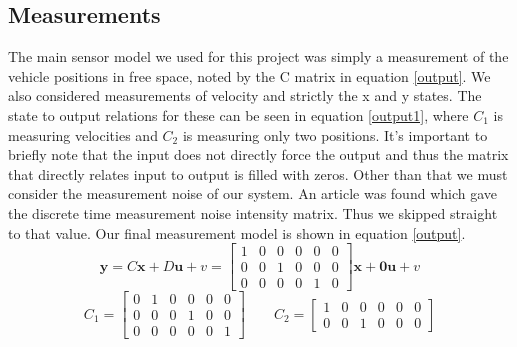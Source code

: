 \documentclass[12pt]{extarticle}
\begin{document}
\subsection{Measurements}{
    The main sensor model we used for this project was simply a measurement of the vehicle positions in free space, noted by the C matrix in equation \ref{output}. We also considered measurements of velocity and strictly the x and y states. The state to output relations for these can be seen in equation \ref{output1}, where $C_1$ is measuring velocities and $C_2$ is measuring only two positions. It's important to briefly note that the input does not directly force the output and thus the matrix that directly relates input to output is filled with zeros. Other than that we must consider the measurement noise of our system. An article was found which gave the discrete time measurement noise intensity matrix. Thus we skipped straight to that value. Our final measurement model is shown in equation \ref{output}.
    \begin{equation}\label{output}
        \pmb{y}=C\pmb{x}+D\pmb{u}+v=
        \begin{bmatrix}
        1&0&0&0&0&0\\
        0&0&1&0&0&0\\
        0&0&0&0&1&0
        \end{bmatrix}\pmb{x}+\pmb{0}\pmb{u}+v       
    \end{equation}
    \begin{equation}\label{output1}
        C_1=\begin{bmatrix}0&1&0&0&0&0\\0&0&0&1&0&0\\0&0&0&0&0&1\end{bmatrix}\qquad
        C_2=\begin{bmatrix}1&0&0&0&0&0\\0&0&1&0&0&0\end{bmatrix}
    \end{equation}
}
\end{document}
